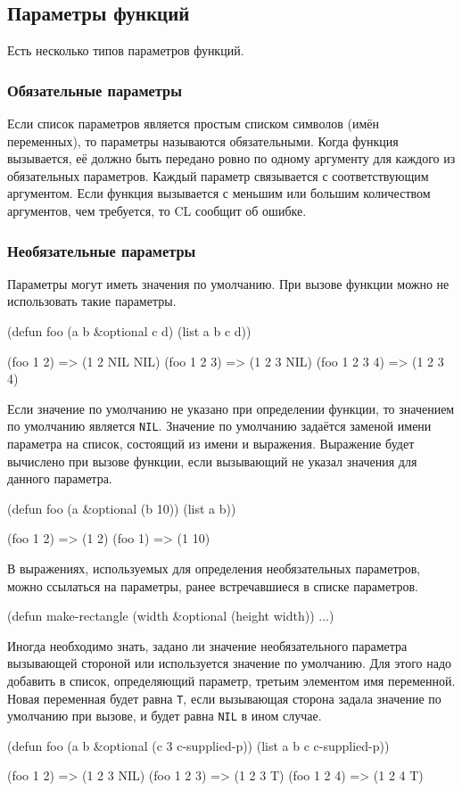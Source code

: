 \subsection{Параметры функций}
Есть несколько типов параметров функций.

\subsubsection{Обязательные параметры}
Если список параметров является простым списком символов (имён переменных), то параметры называются обязательными. Когда функция вызывается, её должно быть передано ровно по одному аргументу для каждого из обязательных параметров. Каждый параметр связывается с соответствующим аргументом. Если функция вызывается с меньшим или большим количеством аргументов, чем требуется, то CL сообщит об ошибке.

\subsubsection{Необязательные параметры}
Параметры могут иметь значения по умолчанию. При вызове функции можно не использовать такие параметры.
\begin{cllst}{}{}
(defun foo (a b &optional c d) 
  (list a b c d))

(foo 1 2)     => (1 2 NIL NIL)
(foo 1 2 3)   => (1 2 3 NIL)
(foo 1 2 3 4) => (1 2 3 4)
\end{cllst}

Если значение по умолчанию не указано при определении функции, то значением по умолчанию является \lstinline{NIL}. Значение по умолчанию задаётся заменой имени параметра на список, состоящий из имени и выражения. Выражение будет вычислено при вызове функции, если вызывающий не указал значения для данного параметра.
\begin{cllst}{}{}
(defun foo (a &optional (b 10)) 
    (list a b))

(foo 1 2) => (1 2)
(foo 1)   => (1 10)
\end{cllst}

В выражениях, используемых для определения необязательных параметров, можно ссылаться на параметры, ранее встречавшиеся в списке параметров.
\begin{cllst}{}{}
(defun make-rectangle (width &optional (height width)) 
  ...)
\end{cllst}

Иногда необходимо знать, задано ли значение необязательного параметра вызывающей стороной или используется значение по умолчанию. Для этого надо добавить в список, определяющий параметр, третьим элементом имя переменной. Новая переменная будет равна \lstinline{T}, если вызывающая сторона задала значение по умолчанию при вызове, и будет равна \lstinline{NIL} в ином случае.
\begin{cllst}{}{}
(defun foo (a b &optional (c 3 c-supplied-p))
  (list a b c c-supplied-p))

(foo 1 2)   => (1 2 3 NIL)
(foo 1 2 3) => (1 2 3 T)
(foo 1 2 4) => (1 2 4 T)
\end{cllst}

